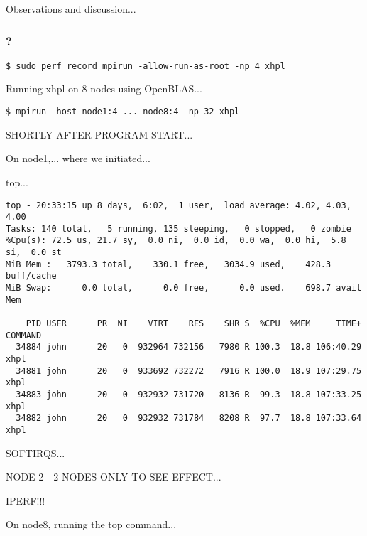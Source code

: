 Observations and discussion...



%
%
\subsubsection{?}

\lstset{style=type}
\begin{lstlisting}
$ sudo perf record mpirun -allow-run-as-root -np 4 xhpl
\end{lstlisting}



Running xhpl on 8 nodes using OpenBLAS...

\lstset{style=type}
\begin{lstlisting}
$ mpirun -host node1:4 ... node8:4 -np 32 xhpl
\end{lstlisting}


SHORTLY AFTER PROGRAM START...

On node1,... where we initiated...

top...

\lstset{style=type}
\begin{lstlisting}
top - 20:33:15 up 8 days,  6:02,  1 user,  load average: 4.02, 4.03, 4.00
Tasks: 140 total,   5 running, 135 sleeping,   0 stopped,   0 zombie
%Cpu(s): 72.5 us, 21.7 sy,  0.0 ni,  0.0 id,  0.0 wa,  0.0 hi,  5.8 si,  0.0 st
MiB Mem :   3793.3 total,    330.1 free,   3034.9 used,    428.3 buff/cache
MiB Swap:      0.0 total,      0.0 free,      0.0 used.    698.7 avail Mem 

    PID USER      PR  NI    VIRT    RES    SHR S  %CPU  %MEM     TIME+ COMMAND                                                   
  34884 john      20   0  932964 732156   7980 R 100.3  18.8 106:40.29 xhpl                                                      
  34881 john      20   0  933692 732272   7916 R 100.0  18.9 107:29.75 xhpl                                                      
  34883 john      20   0  932932 731720   8136 R  99.3  18.8 107:33.25 xhpl                                                      
  34882 john      20   0  932932 731784   8208 R  97.7  18.8 107:33.64 xhpl                                                      
\end{lstlisting}

SOFTIRQS...


NODE 2 - 2 NODES ONLY TO SEE EFFECT...

IPERF!!!

On node8, running the top command...

